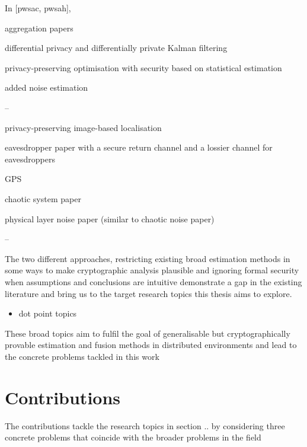 In [pwsac, pwsah], 



aggregation papers

differential privacy and differentially private Kalman filtering

privacy-preserving optimisation with security based on statistical estimation

added noise estimation

--

privacy-preserving image-based localisation

eavesdropper paper with a secure return channel and a lossier channel for eavesdroppers

GPS

chaotic system paper

physical layer noise paper (similar to chaotic noise paper)

--


The two different approaches, restricting existing broad estimation methods in some ways to make cryptographic analysis plausible and ignoring formal security when assumptions and conclusions are intuitive demonstrate a gap in the existing literature and bring us to the target research topics this thesis aims to explore.

\begin{itemize}
    \item dot point topics
\end{itemize}

These broad topics aim to fulfil the goal of generalisable but cryptographically provable estimation and fusion methods in distributed environments and lead to the concrete problems tackled in this work

% 
%                                                
%                                                
%                                                
% 
\section{Contributions}

The contributions tackle the research topics in section .. by considering three concrete problems that coincide with the broader problems in the field



